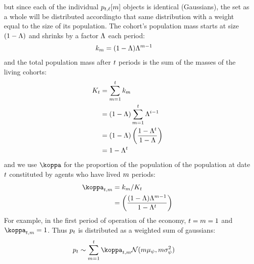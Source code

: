 \documentclass[\econtexRoot/BufferStockTheory.tex]{subfiles}
\begin{document}
but since each of the individual $p_{t,\ell}[m]$ objects is identical (Gaussians), the set as a whole will be distributed accordingto that same distribution with a weight equal to the size of its population.  The cohort's population mass starts at size $(1-\Lambda)$ and shrinks by a factor $\Lambda$ each period:
\begin{align}
  k_{m} & =  (1-\Lambda)\Lambda^{m-1} \label{eq:mass}
\end{align}
and the total population mass after $t$ periods is the sum of the masses of the living cohorts:
\begin{align*}
  K_{t} & =  \sum_{m=1}^{t}k_{m}
  \\ & =  (1-\Lambda)\sum_{m=1}^{t}\Lambda^{i-1}
  \\ & =  (1-\Lambda)\left(\frac{1-\Lambda^{t}}{1-\Lambda}\right)
  \\ & = 1-\Lambda^{t}
\end{align*}
and we use $\wgt$ for the proportion of the population of the population at date $t$ constituted by agents who have lived $m$ periods:
\begin{align}
  \wgt_{\FutPer,\LooPer} & =  \mass_{\LooPer}/\Mass_{\FutPer} \label{eq:wgt}
  \\ & = \left(\frac{(1-\Liv)\Liv^{\LooPer-1}}{1-\Liv^{\FutPer}}\right) \notag
\end{align}
For example, in the first period of operation of the economy, $t=m=1$ and $\wgt_{\FutPer,\LooPer}=1$.
Thus $p_{t}$ is distributed as a weighted sum of gaussians:
\begin{align}
  \pLog_{\FutPer} & \sim \sum_{\LooPer=1}^{\FutPer}\wgt_{\FutPer,\LooPer}\mathcal{N}(\LooPer \pShkMean,\LooPer \sigma^{2}_{\DnsShk})
\end{align}
\end{document}
